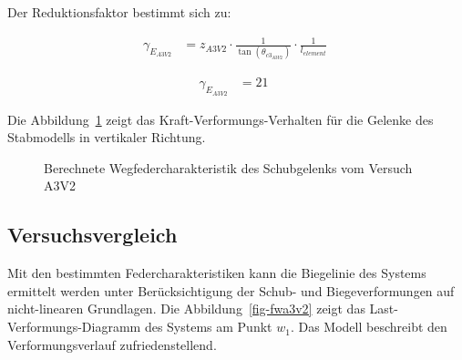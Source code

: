 \documentclass[
  10pt,
  letterpaper,
]{scrreprt}
\begin{document}
Der Reduktionsfaktor bestimmt sich zu:

$$
\begin{aligned}
\gamma_{E_{A3V2}} &= z_{A3V2} \cdot \frac{ 1 }{ \tan \left( \theta_{c3_{A3V2}} \right) } \cdot \frac{1} { l_{element} } \; 
\end{aligned}
$$

$$
\begin{aligned}
\gamma_{E_{A3V2}} &= 21\ \;
\end{aligned}
$$

Die Abbildung~\ref{fig-wegfeder-schub-a3v2} zeigt das
Kraft-Verformungs-Verhalten für die Gelenke des Stabmodells in
vertikaler Richtung.

\begin{figure}[H]


\caption{\label{fig-wegfeder-schub-a3v2}Berechnete
Wegfedercharakteristik des Schubgelenks vom Versuch A3V2}

\end{figure}%

\subsection{Versuchsvergleich}\label{versuchsvergleich}

Mit den bestimmten Federcharakteristiken kann die Biegelinie des Systems
ermittelt werden unter Berücksichtigung der Schub- und Biegeverformungen
auf nicht-linearen Grundlagen. Die Abbildung~\ref{fig-fwa3v2} zeigt das
Last-Verformungs-Diagramm des Systems am Punkt \(w_1\). Das Modell
beschreibt den Verformungsverlauf zufriedenstellend.
\end{document}
